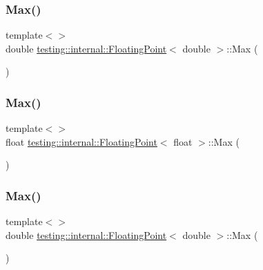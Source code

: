 \subsubsection{\texorpdfstring{Max()}{Max()}\hspace{0.1cm}{\footnotesize\ttfamily [7/9]}}
{\footnotesize\ttfamily template$<$$>$ \\
double \mbox{\hyperlink{classtesting_1_1internal_1_1_floating_point}{testing\+::internal\+::\+Floating\+Point}}$<$ double $>$\+::Max (\begin{DoxyParamCaption}{ }\end{DoxyParamCaption})\hspace{0.3cm}{\ttfamily [inline]}}

\mbox{\label{classtesting_1_1internal_1_1_floating_point_af2eda9331e679229a1baa3404b57b51d}} 
\subsubsection{\texorpdfstring{Max()}{Max()}\hspace{0.1cm}{\footnotesize\ttfamily [8/9]}}
{\footnotesize\ttfamily template$<$$>$ \\
float \mbox{\hyperlink{classtesting_1_1internal_1_1_floating_point}{testing\+::internal\+::\+Floating\+Point}}$<$ float $>$\+::Max (\begin{DoxyParamCaption}{ }\end{DoxyParamCaption})\hspace{0.3cm}{\ttfamily [inline]}}

\mbox{\label{classtesting_1_1internal_1_1_floating_point_afc2e85c0e886cb13b2300e961c9a9648}} 
\subsubsection{\texorpdfstring{Max()}{Max()}\hspace{0.1cm}{\footnotesize\ttfamily [9/9]}}
{\footnotesize\ttfamily template$<$$>$ \\
double \mbox{\hyperlink{classtesting_1_1internal_1_1_floating_point}{testing\+::internal\+::\+Floating\+Point}}$<$ double $>$\+::Max (\begin{DoxyParamCaption}{ }\end{DoxyParamCaption})\hspace{0.3cm}{\ttfamily [inline]}}

